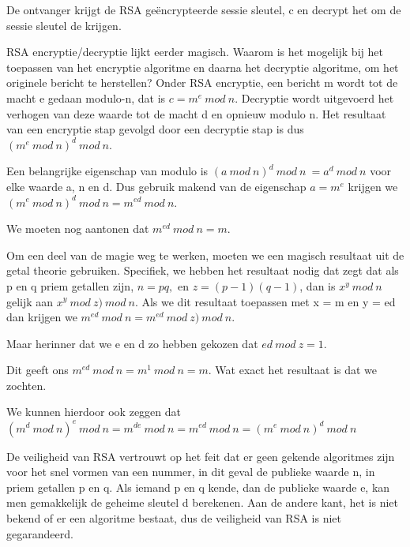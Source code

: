 \noindent De ontvanger krijgt de RSA geëncrypteerde sessie sleutel, c en decrypt het om de sessie sleutel de krijgen.

\newpage


RSA encryptie/decryptie lijkt eerder magisch. Waarom is het mogelijk bij het toepassen van het encryptie algoritme en daarna het decryptie algoritme, om het originele bericht te herstellen? 
Onder RSA encryptie, een bericht m wordt tot de macht e gedaan modulo-n, dat is $c = m^e\ mod\ n$.
Decryptie wordt uitgevoerd het verhogen van deze waarde tot de macht d en opnieuw modulo n. Het resultaat van een encryptie stap gevolgd door een decryptie stap is dus $(m^e\ mod\ n)^d\ mod\ n$.

\noindent Een belangrijke eigenschap van modulo is $(a\ mod\ n)^d\ mod\ n\ = a^d\ mod\ n$ voor elke waarde a, n en d. Dus gebruik makend van de eigenschap $a = m^e$ krijgen we $(m^e\ mod\ n)^d\ mod\ n = m^{ed}\ mod\ n$.

\noindent We moeten nog aantonen dat $m^{ed}\ mod\ n = m$.

\noindent Om een deel van de magie weg te werken, moeten we een magisch resultaat uit de getal theorie gebruiken. Specifiek, we hebben het resultaat nodig dat zegt dat als p en q priem getallen zijn, $n = pq, $ en $ z = (p - 1)(q - 1)$, dan is $x^y\ mod\ n$ gelijk aan $x^{y}\ mod\ z) \ mod\ n$. Als we dit resultaat toepassen met x = m en y = ed dan krijgen we $m^{ed}\ mod\ n = m^{ed}\ mod\ z) \ mod\ n$.

\noindent Maar herinner dat we e en d zo hebben gekozen dat $ed\ mod\ z = 1$. 

\noindent Dit geeft ons $m^{ed}\ mod\ n = m^1\ mod\ n = m$. Wat exact het resultaat is dat we zochten. 

\noindent We kunnen hierdoor ook zeggen dat $(m^d\ mod\ n)^e\ mod\ n = m^{de}\ mod\ n = m^{ed}\ mod\ n = (m^e\ mod\ n)^d\ mod\ n$

\noindent De veiligheid van RSA vertrouwt op het feit dat er geen gekende algoritmes zijn voor het snel vormen van een nummer, in dit geval de publieke waarde n, in priem getallen p en q. Als iemand p en q kende, dan de publieke waarde e, kan men gemakkelijk de geheime sleutel d berekenen.
Aan de andere kant, het is niet bekend of er een algoritme bestaat, dus de veiligheid van RSA is niet gegarandeerd.
